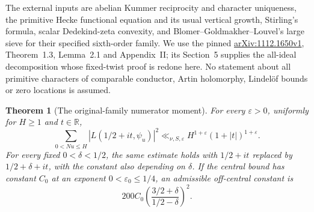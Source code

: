 \documentclass[11pt,oneside,openany]{book}
\newtheorem{theorem}{Theorem}[chapter]
\theoremstyle{definition}\newtheorem{definition}[theorem]{Definition}
\theoremstyle{remark}\newtheorem{remark}[theorem]{Remark}
\begin{document}
The external inputs are abelian Kummer reciprocity and character
uniqueness, the primitive Hecke functional equation and its usual
vertical growth, Stirling's formula, scalar Dedekind-zeta convexity, and
Blomer--Goldmakher--Louvel's large sieve for their specified sixth-order
family. We use the pinned
\href{https://arxiv.org/pdf/1112.1650v1}{arXiv:1112.1650v1},
Theorem~1.3, Lemma~2.1 and Appendix~II; its Section~5 supplies the
all-ideal decomposition whose fixed-twist proof is redone here.
No statement about all primitive characters of comparable conductor,
Artin holomorphy, Lindel\"of bounds or zero locations is assumed.

\begin{theorem}[The original-family numerator moment]
\label{mm:afm}
For every $\varepsilon>0$, uniformly for $H\ge1$ and $t\in\mathbb R$,
\begin{equation}\label{mm:central}
 \sum_{0<Nu\le H}|L(1/2+it,\psi_u)|^2
 \ll_{\nu,S,\varepsilon}H^{1+\varepsilon}(1+|t|)^{1+\varepsilon}.
\end{equation}
For every fixed $0<\delta<1/2$, the same estimate holds with
$1/2+it$ replaced by $1/2+\delta+it$, with the constant also depending
on $\delta$. If the central bound has constant $C_0$ at an exponent
$0<\varepsilon_0\le1/4$, an admissible off-central constant is
\begin{equation}\label{mm:poisson-constant}
 200 C_0\left(\frac{3/2+\delta}{1/2-\delta}\right)^2.
\end{equation}
\end{theorem}
\end{document}
